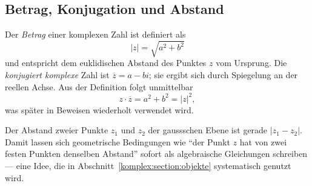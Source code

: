 \subsection{Betrag, Konjugation und Abstand
\label{komplex:subsection:betrag}}
Der \emph{Betrag} einer komplexen Zahl ist definiert als
\begin{equation}
|z|
=
\!\sqrt{a^2 + b^2}
\label{komplex:eq:betrag}
\end{equation}
und entspricht dem euklidischen Abstand des Punktes $z$ vom Ursprung.
Die \emph{konjugiert komplexe} Zahl ist $\overline{z} = a - bi$;
%
sie ergibt sich durch Spiegelung an der reellen Achse.
Aus der Definition folgt unmittelbar
\begin{equation}
z \cdot \overline{z}
=
a^2 + b^2
=
|z|^2 ,
\label{komplex:eq:konjugation}
\end{equation}
was später in Beweisen wiederholt verwendet wird.

Der Abstand zweier Punkte $z_1$ und $z_2$ der gaussschen Ebene ist gerade
$|z_1 - z_2|$.
Damit lassen sich geometrische Bedingungen wie ``der Punkt $z$ hat von zwei
festen Punkten denselben Abstand'' sofort als algebraische Gleichungen
schreiben --- eine Idee, die in Abschnitt~\ref{komplex:section:objekte}
systematisch genutzt wird.
